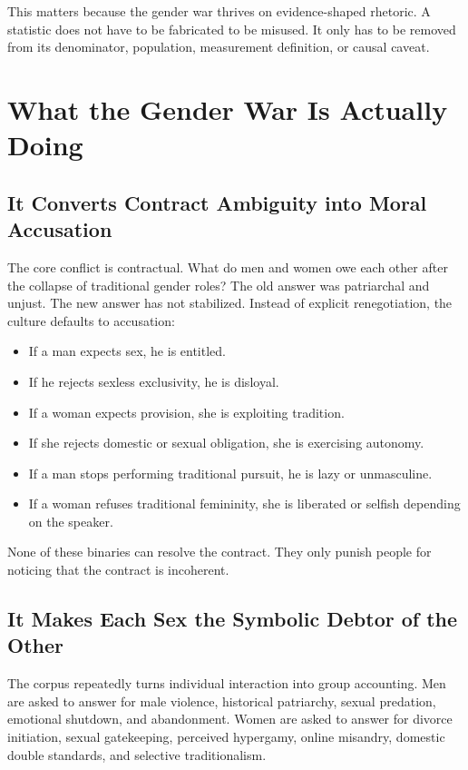 \documentclass[12pt]{article}
\begin{document}
This matters because the gender war thrives on evidence-shaped rhetoric. A statistic does not have to be fabricated to be misused. It only has to be removed from its denominator, population, measurement definition, or causal caveat.

\section{What the Gender War Is Actually Doing}

\subsection{It Converts Contract Ambiguity into Moral Accusation}

The core conflict is contractual. What do men and women owe each other after the collapse of traditional gender roles? The old answer was patriarchal and unjust. The new answer has not stabilized. Instead of explicit renegotiation, the culture defaults to accusation:

\begin{itemize}
  \item If a man expects sex, he is entitled.
  \item If he rejects sexless exclusivity, he is disloyal.
  \item If a woman expects provision, she is exploiting tradition.
  \item If she rejects domestic or sexual obligation, she is exercising autonomy.
  \item If a man stops performing traditional pursuit, he is lazy or unmasculine.
  \item If a woman refuses traditional femininity, she is liberated or selfish depending on the speaker.
\end{itemize}

None of these binaries can resolve the contract. They only punish people for noticing that the contract is incoherent.

\subsection{It Makes Each Sex the Symbolic Debtor of the Other}

The corpus repeatedly turns individual interaction into group accounting. Men are asked to answer for male violence, historical patriarchy, sexual predation, emotional shutdown, and abandonment. Women are asked to answer for divorce initiation, sexual gatekeeping, perceived hypergamy, online misandry, domestic double standards, and selective traditionalism.
\end{document}

